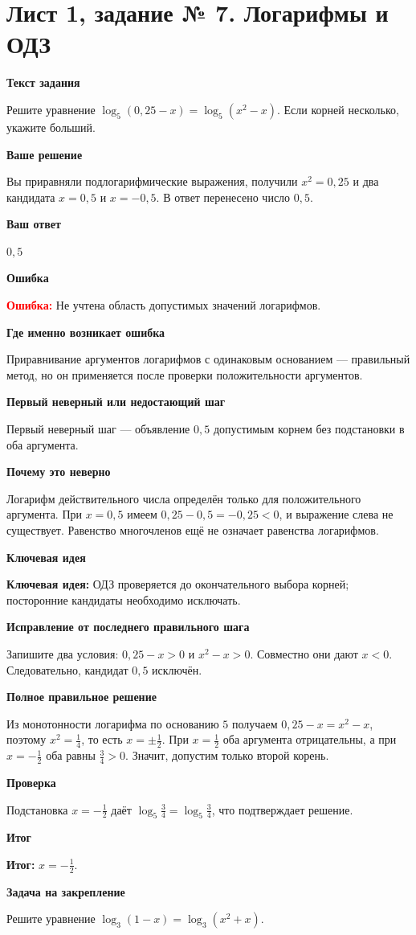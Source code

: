 \documentclass[11pt,a4paper]{article}
\newcommand{\Idea}{\textcolor{blue!60!black}{\textbf{Ключевая идея:}}}
\newcommand{\Res}{\textcolor{teal!60!black}{\textbf{Итог:}}}
\newcommand{\Heading}[2]{\par\medskip\textbf{#1}\par#2\par}
\begin{document}
\section*{Лист 1, задание № 7. Логарифмы и ОДЗ}
\Heading{Текст задания}{Решите уравнение $\log_5(0{,}25-x)=\log_5(x^2-x)$. Если корней несколько, укажите больший.}
\Heading{Ваше решение}{Вы приравняли подлогарифмические выражения, получили $x^2=0{,}25$ и два кандидата $x=0{,}5$ и $x=-0{,}5$. В ответ перенесено число $0{,}5$.}
\Heading{Ваш ответ}{$0{,}5$}
\Heading{Ошибка}{\textcolor{red}{\textbf{Ошибка:}} Не учтена область допустимых значений логарифмов.}
\Heading{Где именно возникает ошибка}{Приравнивание аргументов логарифмов с одинаковым основанием --- правильный метод, но он применяется после проверки положительности аргументов.}
\Heading{Первый неверный или недостающий шаг}{Первый неверный шаг --- объявление $0{,}5$ допустимым корнем без подстановки в оба аргумента.}
\Heading{Почему это неверно}{Логарифм действительного числа определён только для положительного аргумента. При $x=0{,}5$ имеем $0{,}25-0{,}5=-0{,}25<0$, и выражение слева не существует. Равенство многочленов ещё не означает равенства логарифмов.}
\Heading{Ключевая идея}{\Idea{} ОДЗ проверяется до окончательного выбора корней; посторонние кандидаты необходимо исключать.}
\Heading{Исправление от последнего правильного шага}{Запишите два условия: $0{,}25-x>0$ и $x^2-x>0$. Совместно они дают $x<0$. Следовательно, кандидат $0{,}5$ исключён.}
\Heading{Полное правильное решение}{Из монотонности логарифма по основанию $5$ получаем $0{,}25-x=x^2-x$, поэтому $x^2=\frac14$, то есть $x=\pm\frac12$. При $x=\frac12$ оба аргумента отрицательны, а при $x=-\frac12$ оба равны $\frac34>0$. Значит, допустим только второй корень.}
\Heading{Проверка}{Подстановка $x=-\frac12$ даёт $\log_5\frac34=\log_5\frac34$, что подтверждает решение.}
\Heading{Итог}{\Res{} $x=-\frac12$.}
\Heading{Задача на закрепление}{Решите уравнение $\log_3(1-x)=\log_3(x^2+x)$.}
\newpage
{}\label{task:1_9}
\end{document}
